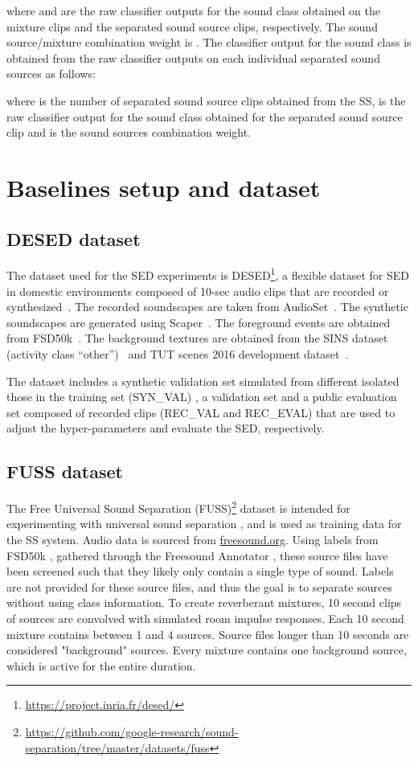 \documentclass{article}
\begin{document}
\begin{sloppy}
where  and  are the raw classifier outputs for the sound class  obtained on the mixture clips and the separated sound source clips, respectively. The sound source/mixture combination weight is . The classifier output for the sound class  is obtained from the raw classifier outputs on each individual separated sound sources as follows:

where  is the number of separated sound source clips obtained from the SS,  is the raw classifier output for the sound class  obtained for the separated sound source clip  and  is the sound sources combination weight.
\section{Baselines setup and dataset}
\label{sec:base_bdd}
\subsection{DESED dataset}
The dataset used for the SED experiments is DESED\footnote{\url{https://project.inria.fr/desed/}}, a flexible dataset for SED in domestic environments composed of 10-sec audio clips that are recorded or synthesized~\cite{turpault_2019,serizel_2020}. The recorded soundscapes are taken from AudioSet~\cite{Gemmeke2017audioset}. The synthetic soundscapes are generated using Scaper~\cite{salamon2017scaper}. The foreground events are obtained from FSD50k~\cite{font2013freesound,fonseca2020fsd50k}. The background textures are obtained from the SINS dataset (activity class ``other'')~\cite{Dekkers2017} and TUT scenes 2016 development dataset~\cite{mesaros_tut_2016}.

The dataset includes a synthetic validation set simulated from different isolated those in the training set (SYN\_VAL) , a validation set  and a public evaluation set composed of recorded clips (REC\_VAL and REC\_EVAL) that are used to adjust the hyper-parameters and evaluate the SED, respectively.


\subsection{FUSS dataset}

The Free Universal Sound Separation (FUSS)\footnote{\url{https://github.com/google-research/sound-separation/tree/master/datasets/fuss}} dataset \cite{wisdom2020fuss} is intended for experimenting with universal sound separation \cite{kavalerov2019universal}, and is used as training data for the SS system.
Audio data is sourced from \url{freesound.org}. Using labels from FSD50k \cite{fonseca2020fsd50k}, gathered through the Freesound Annotator \cite{Fonseca2017freesound}, these source files have been screened such that they likely only contain a single type of sound. Labels are not provided for these source files, and thus the goal is to separate sources without using class information.
To create reverberant mixtures, 10 second clips of sources are convolved with simulated room impulse responses. Each 10 second mixture contains between 1 and 4 sources. Source files longer than 10 seconds are considered "background" sources. Every mixture contains one background source, which is active for the entire duration.


\end{sloppy}
\end{document}

